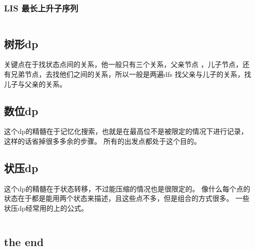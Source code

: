 \documentclass[a4paper,11pt]{article}
\begin{document}
\begin{CJK}{UTF8}{gbsn}
\subsubsection{LIS 最长上升子序列}
\inputminted{c++}{../scoure/dp/longerxuelie.cpp}
\subsection{树形dp}
关键点在于找状态点间的关系，他一般只有三个关系，父亲节点
，儿子节点，还有兄弟节点，去找他们之间的关系，所以一般是两遍dfs
找父亲与儿子的关系，找儿子与父亲的关系。
\subsection{数位dp}
这个dp的精髓在于记忆化搜索，也就是在最高位不是被限定的情况下进行记录，这样的话省掉很多多余的步骤。
所有的出发点都处于这个目的。
\subsection{状压dp}
这个dp的精髓在于状态转移，不过能压缩的情况也是很限定的。
像什么每个点的状态在于都是能用两个状态来描述，且这些点不多，但是组合的方式很多。
一些状压dp经常用的上的公式。
\inputminted{c++}{../scoure/dp/zhuangtai.cpp}
\subsection{the end}
\end{CJK}
\end{document}
